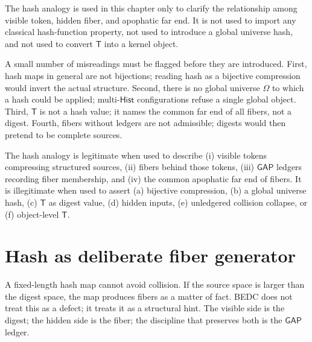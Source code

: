 \begin{principle}
\label{prin:hash-like-analogy-visibility}
The hash analogy is used in this chapter only to clarify the relationship among visible token, hidden fiber, and apophatic far end. It is not used to import any classical hash-function property, not used to introduce a global universe hash, and not used to convert $\mathsf{T}$ into a kernel object.
\end{principle}

A small number of misreadings must be flagged before they are introduced. First, hash maps in general are not bijections; reading hash as a bijective compression would invert the actual structure. Second, there is no global universe $\Omega$ to which a hash could be applied; multi-$\mathsf{Hist}$ configurations refuse a single global object. Third, $\mathsf{T}$ is not a hash value; it names the common far end of all fibers, not a digest. Fourth, fibers without ledgers are not admissible; digests would then pretend to be complete sources.

\begin{principle}
\label{prin:hash-like-legitimate-scope}
The hash analogy is legitimate when used to describe (i) visible tokens compressing structured sources, (ii) fibers behind those tokens, (iii) $\mathsf{GAP}$ ledgers recording fiber membership, and (iv) the common apophatic far end of fibers. It is illegitimate when used to assert (a) bijective compression, (b) a global universe hash, (c) $\mathsf{T}$ as digest value, (d) hidden inputs, (e) unledgered collision collapse, or (f) object-level $\mathsf{T}$.
\end{principle}

\section{Hash as deliberate fiber generator}
\label{sec:hash-like-fiber-generator}

A fixed-length hash map cannot avoid collision. If the source space is larger than the digest space, the map produces fibers as a matter of fact. BEDC does not treat this as a defect; it treats it as a structural hint. The visible side is the digest; the hidden side is the fiber; the discipline that preserves both is the $\mathsf{GAP}$ ledger.

